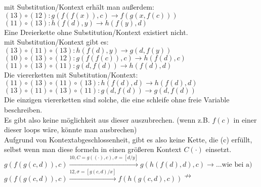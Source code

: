 \documentclass{article}
\begin{document}
	mit Substitution/Kontext erhält man außerdem:\\
	$(13) \circ (12): g(f(f(x)),c)\to f(g(x,f(c)))$\\
	$(11)\circ (13): h(f(d),y)\to h(f(y),d)$\\
	Eine Dreierkette ohne Substitution/Kontext existiert nicht.\\
	mit Substitution/Kontext gibt es:\\
	$(13)\circ (11)\circ(13): h(f(d),y)\to g(d,f(y))$\\
	$(10)\circ (13)\circ(12): g(f(f(c)), c)\to h(f(d),c)$\\
	$(11)\circ(13)\circ (11): g(d,f(d))\to h(f(d),d)$\\
	Die viererketten mit Substitution/Kontext:\\
	$(11)\circ(13)\circ (11)\circ(13): h(f(d),d)\to h(f(d),d)$\\
	$(13)\circ(11)\circ (13)\circ(11): g(d,f(d))\to g(d,f(d))$\\
	Die einzigen viererketten sind solche, die eine schleife ohne freie Variable beschreiben.\\
	Es gibt also keine möglichkeit aus dieser auszubrechen. (wenn z.B. $f(c)$ in einer dieser loops wäre, könnte man ausbrechen)\\
	Aufgrund von Kontextabgeschlossenheit, gibt es also keine Kette, die (c) erfüllt, selbst wenn man diese formeln in einen größeren Kontext $C(\cdot)$ einsetzt.\\
	$g(f(g(c,d)),c)\stackrel{10, C=g((\cdot),c),\sigma=[d/y]}{\to} g(h(f(d),d), c) \to\dots\text{wie bei a)}$\\
	$g(f(g(c,d)),c)\stackrel{12, \sigma=[g(c,d)/x]}{\to} f(h(g(c,d),c))\nrightarrow$
\end{document}

